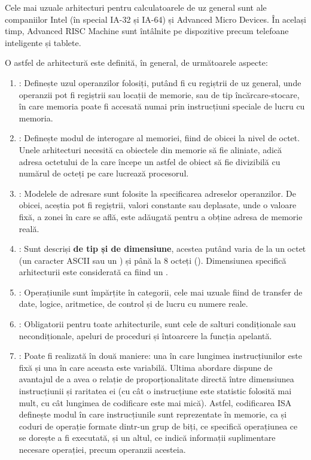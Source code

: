 \documentclass[../../main.tex]{subfiles}
\begin{document}
Cele mai uzuale arhitecturi pentru calculatoarele de uz general sunt ale companiilor Intel (în special IA-32 și IA-64) și Advanced Micro Devices. În același timp, Advanced RISC Machine sunt întâlnite pe dispozitive precum telefoane inteligente și tablete.

O astfel de arhitectură este definită, în general, de următoarele aspecte:
\begin{enumerate}
    \item {}: Definește uzul operanzilor folosiți, putând fi cu regiștrii de uz general, unde operanzii pot fi regiștrii sau locații de memorie, sau de tip încărcare-stocare, în care memoria poate fi accesată numai prin instrucți\-uni speciale de lucru cu memoria.
    \item {}: Definește modul de interogare al memoriei, fiind de obicei la nivel de octet. Unele arhitecturi necesită ca obiectele din memorie să fie aliniate, adică adresa octetului de la care începe un astfel de obiect să fie divizibilă cu numărul de octeți pe care lucrează procesorul.
    \item {}: Modelele de adresare sunt folosite la specificarea adreselor operanzilor. De obicei, aceștia pot fi regiștrii, valori constante sau deplasate, unde o valoare fixă, a zonei în care se află, este adăugată pentru a obține adresa de memorie reală.
    \item {}: Sunt descriși \textbf{de tip și de dimensiune}, acestea putând varia de la un octet (un caracter ASCII sau un ) și până la 8 octeți (). Dimensiunea specifică arhitecturii este considerată ca fiind un .
    \item {}: Operațiunile sunt împărțite în categorii, cele mai uzuale fiind de transfer de date, logice, aritmetice, de control și de lucru cu numere reale.
    \item {}: Obligatorii pentru toate arhitecturile, sunt cele de salturi condiționale sau necondițio\-nale, apeluri de proceduri și întoarcere la funcția apelantă.
    \item {}: Poate fi realizată în două maniere: una în care lungimea instrucțiunilor este fixă și una în care aceasta este variabilă. Ultima abordare dispune de avantajul de a avea o relație de proporționalitate directă între dimensiunea instrucțiunii și raritatea ei (cu cât o instrucțiune este statistic folosită mai mult, cu cât lungimea de codificare este mai mică). Astfel, codificarea ISA definește modul în care instrucțiunile sunt reprezentate în memorie, ca și coduri de operație formate dintr-un grup de biți, ce specifică operațiunea ce se dorește a fi executată, și un altul, ce indică informații suplimentare necesare operației, precum operanzii acesteia.
\end{enumerate}
\end{document}
